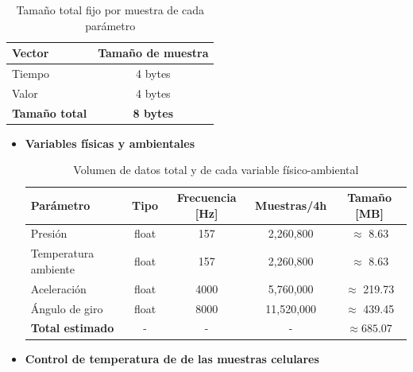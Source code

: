       \begin{table}[H]
      \centering
      \begin{tabular}{|l|c|}
      \hline
      \textbf{Vector} & \textbf{Tamaño de muestra} \\
      \hline
      Tiempo & 4 bytes \\
      Valor  & 4 bytes \\
      \hline
      \textbf{Tamaño total} & \textbf{8 bytes} \\
      \hline
      \end{tabular}
      \caption{Tamaño total fijo por muestra de cada parámetro}
      \label{tab:tamanio_muestra}
      \end{table}

      \begin{itemize}

        \item \textbf{Variables físicas y ambientales}

        \begin{table}[H]
        \centering
        \begin{tabular}{|l|c|c|c|c|}
        \hline
        \textbf{Parámetro} & \textbf{Tipo} & \textbf{Frecuencia [Hz]} & \textbf{Muestras/4h} & \textbf{Tamaño [MB]} \\
        \hline
        Presión               & float & 157   & 2,260,800  & $\approx$ 8.63     \\
        Temperatura ambiente  & float & 157   & 2,260,800  & $\approx$ 8.63     \\
        Aceleración           & float & 4000  & 5,760,000  & $\approx$ 219.73   \\
        Ángulo de giro        & float & 8000  & 11,520,000 & $\approx$ 439.45   \\
        \hline
        \textbf{Total estimado} & -    & -     & -         & $\boldsymbol{\approx 685.07}$ \\
        \hline
        \end{tabular}
        \caption{Volumen de datos total y de cada variable físico-ambiental}
        \label{tab:volumen_datos}
        \end{table}

        \item \textbf{Control de temperatura de de las muestras celulares}


\end{itemize}
